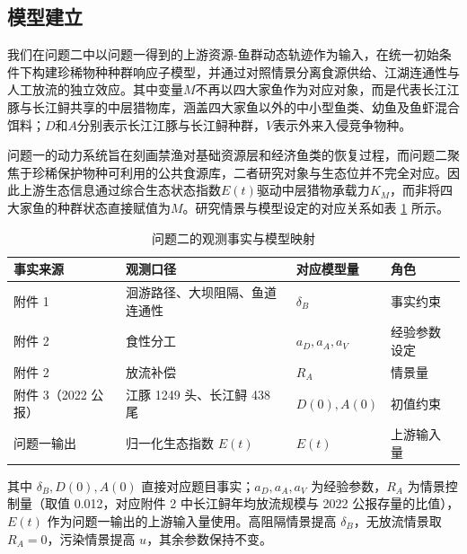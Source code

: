 \subsection{模型建立}
我们在问题二中以问题一得到的上游资源-鱼群动态轨迹作为输入，在统一初始条件下构建珍稀物种种群响应子模型，并通过对照情景分离食源供给、江湖连通性与人工放流的独立效应。其中变量$M$不再以四大家鱼作为对应对象，而是代表长江江豚与长江鲟共享的中层猎物库，涵盖四大家鱼以外的中小型鱼类、幼鱼及鱼虾混合饵料；$D$和$A$分别表示长江江豚与长江鲟种群，$V$表示外来入侵竞争物种。

问题一的动力系统旨在刻画禁渔对基础资源层和经济鱼类的恢复过程，而问题二聚焦于珍稀保护物种可利用的公共食源库，二者研究对象与生态位并不完全对应。因此上游生态信息通过综合生态状态指数$E(t)$驱动中层猎物承载力$K_M$，而非将四大家鱼的种群状态直接赋值为$M$。研究情景与模型设定的对应关系如表 \ref{tab:q2map} 所示。
\begin{table}[htbp]
\centering
\caption{问题二的观测事实与模型映射}
\label{tab:q2map}
\begin{tabularx}{0.95\textwidth}{>{\raggedright\arraybackslash}p{2.4cm} >{\raggedright\arraybackslash}p{4.2cm} >{\raggedright\arraybackslash}p{3.6cm} X}
\toprule
事实来源 & 观测口径 & 对应模型量 & 角色 \\
\midrule
附件 1 & 洄游路径、大坝阻隔、鱼道连通性 & $\delta_B$ & 事实约束 \\
附件 2 & 食性分工 & $a_D,a_A,a_V$ & 经验参数设定 \\
附件 2 & 放流补偿 & $R_A$ & 情景量 \\
附件 3（2022 公报） & 江豚 1249 头、长江鲟 438 尾 & $D(0),A(0)$ & 初值约束 \\
问题一输出 & 归一化生态指数 $E(t)$ & $E(t)$ & 上游输入量 \\
\bottomrule
\end{tabularx}
\end{table}
其中 $\delta_B,D(0),A(0)$ 直接对应题目事实；$a_D,a_A,a_V$ 为经验参数，$R_A$ 为情景控制量（取值 0.012，对应附件 2 中长江鲟年均放流规模与 2022 公报存量的比值），$E(t)$ 作为问题一输出的上游输入量使用。高阻隔情景提高 $\delta_B$，无放流情景取 $R_A=0$，污染情景提高 $u$，其余参数保持不变。

